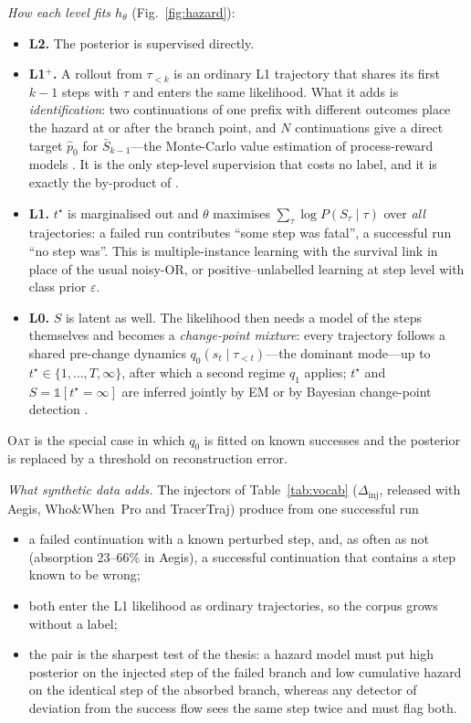 \emph{How each level fits $h_\theta$} (Fig.~\ref{fig:hazard}):
\begin{itemize}[leftmargin=1.1em]
\item \textbf{L2.} The posterior is supervised directly.
\item \textbf{L1$^{+}$.} A rollout from $\tau_{<k}$ is an ordinary L1 trajectory that shares its first $k-1$ steps with $\tau$ and enters the same likelihood. What it adds is \emph{identification}: two continuations of one prefix with different outcomes place the hazard at or after the branch point, and $N$ continuations give a direct target $\hat p_0$ for $\bar S_{k-1}$---the Monte-Carlo value estimation of process-reward models \cite{wang2024mathshepherd}. It is the only step-level supervision that costs no label, and it is exactly the by-product of .
\item \textbf{L1.} $t^\star$ is marginalised out and $\theta$ maximises $\sum_\tau\log P(S_\tau\mid\tau)$ over \emph{all} trajectories: a failed run contributes ``some step was fatal'', a successful run ``no step was''. This is multiple-instance learning \cite{dietterich1997mil} with the survival link in place of the usual noisy-OR, or positive--unlabelled learning at step level \cite{elkan2008pu,kiryo2017nnpu} with class prior $\varepsilon$.
\item \textbf{L0.} $S$ is latent as well. The likelihood then needs a model of the steps themselves and becomes a \emph{change-point mixture}: every trajectory follows a shared pre-change dynamics $q_0(s_t\mid\tau_{<t})$---the dominant mode---up to $t^\star\in\{1,\dots,T,\infty\}$, after which a second regime $q_1$ applies; $t^\star$ and $S=\mathbb{1}[t^\star{=}\infty]$ are inferred jointly by EM or by Bayesian change-point detection \cite{adams2007bocpd}.
\end{itemize}
\textsc{Oat} is the special case in which $q_0$ is fitted on known successes and the posterior is replaced by a threshold on reconstruction error.

\emph{What synthetic data adds.} The injectors of Table~\ref{tab:vocab} ($\Delta_{\mathrm{inj}}$, released with Aegis, Who\&When~Pro and TracerTraj) produce from one successful run
\begin{itemize}[leftmargin=1.1em]
\item a failed continuation with a known perturbed step, and, as often as not (absorption 23--66\% in Aegis), a successful continuation that contains a step known to be wrong;
\item both enter the L1 likelihood as ordinary trajectories, so the corpus grows without a label;
\item the pair is the sharpest test of the thesis: a hazard model must put high posterior on the injected step of the failed branch and low cumulative hazard on the identical step of the absorbed branch, whereas any detector of deviation from the success flow sees the same step twice and must flag both.
\end{itemize}

